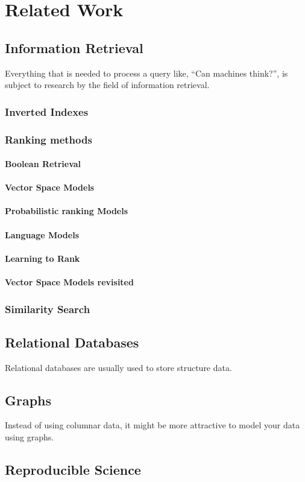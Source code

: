 \chapter{Related Work}
\label{related-work}

\section{Information Retrieval}
Everything that is needed to process a query like, ``Can machines think?'', is subject to research by the field of information retrieval. 

\subsection{Inverted Indexes}

\subsection{Ranking methods}

\subsubsection{Boolean Retrieval}
\subsubsection{Vector Space Models}
\subsubsection{Probabilistic ranking Models}
\subsubsection{Language Models}
\subsubsection{Learning to Rank}
\subsubsection{Vector Space Models revisited}

\subsection{Similarity Search}

\section{Relational Databases}
Relational databases are usually used to store structure data. 

\section{Graphs}
Instead of using columnar data, it might be more attractive to model your data using graphs. 

\section{Reproducible Science}